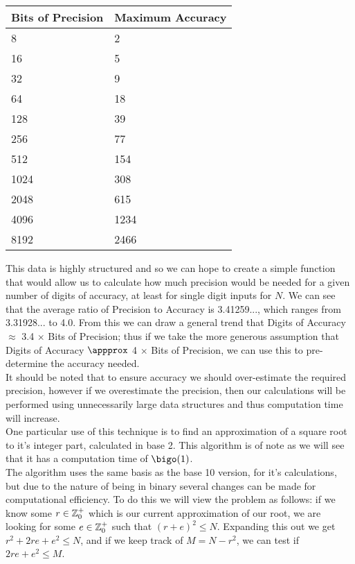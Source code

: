 \begin{center}
\begin{tabular}{|p{3cm}|p{3cm}|}
\hline
Bits of Precision & Maximum Accuracy\\ \hline
8 & 2 \\ \hline
16 & 5 \\ \hline
32 & 9 \\ \hline
64 & 18 \\ \hline
128 & 39 \\ \hline
256 & 77 \\ \hline
512 & 154 \\ \hline
1024 & 308 \\ \hline
2048 & 615 \\ \hline
4096 & 1234 \\ \hline
8192 & 2466 \\ \hline
\end{tabular}
\end{center}

This data is highly structured and so we can hope to create a simple function that would allow us to calculate how much precision would be needed for a given number of digits of accuracy, at least for single digit inputs for \(N\). We can see that the average ratio of Precision to Accuracy is 3.41259..., which ranges from 3.31928... to 4.0. From this we can draw a general trend that Digits of Accuracy \(\approx\) 3.4 \(\times\) Bits of Precision; thus if we take the more generous assumption that Digits of Accuracy \(\appprox\) 4 \(\times\) Bits of Precision, we can use this to pre-determine the accuracy needed.\\

It should be noted that to ensure accuracy we should over-estimate the required precision, however if we overestimate the precision, then our calculations will be performed using unnecessarily large data structures and thus computation time will increase.\\

One particular use of this technique is to find an approximation of a square root to it's integer part, calculated in base 2. This algorithm is of note as we will see that it has a computation time of \(\bigo(1)\).\\

The algorithm uses the same basis as the base 10 version, for it's calculations, but due to the nature of being in binary several changes can be made for computational efficiency. To do this we will view the problem as follows: if we know some \(r \in \mathbb{Z}^+_0\) which is our current approximation of our root, we are looking for some \(e \in \mathbb{Z}^+_0\) such that \((r+e)^2 \le N\). Expanding this out we get \(r^2 + 2re + e^2 \le N\), and if we keep track of \(M = N - r^2\), we can test if \(2re + e^2 \le M\).\\

